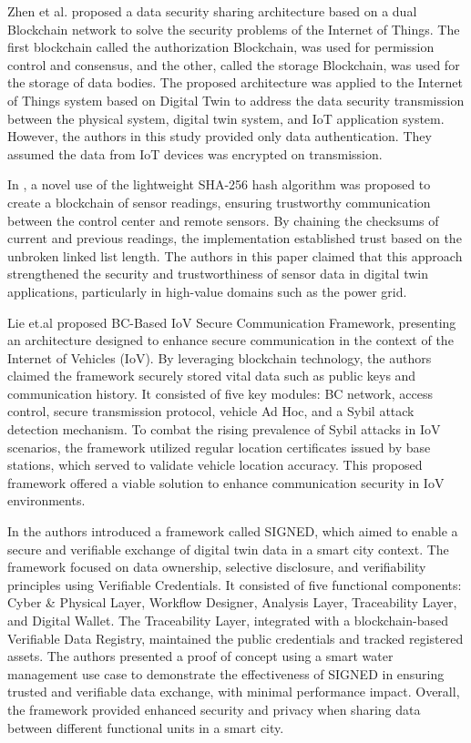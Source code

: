 Zhen et al. \cite{zhengBlockchainBasedTrustworthy2022a} proposed a data security sharing architecture based on a dual Blockchain network to solve the security problems of the Internet of Things. The first blockchain called the authorization Blockchain, was used for permission control and consensus, and the other, called the storage Blockchain, was used for the storage of data bodies. The proposed architecture was applied to the Internet of Things system based on Digital Twin to address the data security transmission between the physical system, digital twin system, and IoT application system. However, the authors in this study provided only data authentication. They assumed the data from IoT devices was encrypted on transmission.

In \cite{danilczykBlockchainChecksumEstablishing2021a}, a novel use of the lightweight SHA-256 hash algorithm was proposed to create a blockchain of sensor readings, ensuring trustworthy communication between the control center and remote sensors. By chaining the checksums of current and previous readings, the implementation established trust based on the unbroken linked list length. The authors in this paper claimed that this approach strengthened the security and trustworthiness of sensor data in digital twin applications, particularly in high-value domains such as the power grid.

Lie et.al \cite{liuBlockchainBasedSecureCommunication2022a} proposed BC-Based IoV Secure Communication Framework, presenting an architecture designed to enhance secure communication in the context of the Internet of Vehicles (IoV). By leveraging blockchain technology, the authors claimed the framework securely stored vital data such as public keys and communication history. It consisted of five key modules: BC network, access control, secure transmission protocol, vehicle Ad Hoc, and a Sybil attack detection mechanism. To combat the rising prevalence of Sybil attacks in IoV scenarios, the framework utilized regular location certificates issued by base stations, which served to validate vehicle location accuracy. This proposed framework offered a viable solution to enhance communication security in IoV environments.

In \cite{pervezSIGNEDSmartCIty2023a} the authors introduced a framework called SIGNED, which aimed to enable a secure and verifiable exchange of digital twin data in a smart city context. The framework focused on data ownership, selective disclosure, and verifiability principles using Verifiable Credentials. It consisted of five functional components: Cyber \& Physical Layer, Workflow Designer, Analysis Layer, Traceability Layer, and Digital Wallet. The Traceability Layer, integrated with a blockchain-based Verifiable Data Registry, maintained the public credentials and tracked registered assets. The authors presented a proof of concept using a smart water management use case to demonstrate the effectiveness of SIGNED in ensuring trusted and verifiable data exchange, with minimal performance impact. Overall, the framework provided enhanced security and privacy when sharing data between different functional units in a smart city.

